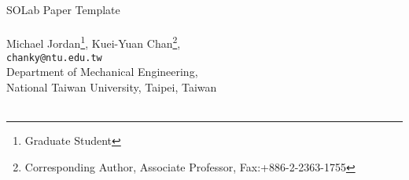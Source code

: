 \documentclass[a4paper,10pt]{article}
\newlength{\defbaselineskip}
\newcommand{\singlespacing}{\setlength{\baselineskip}{1.20 \defbaselineskip}}
\newcommand{\doublespacing}{\setlength{\baselineskip}{1.67 \defbaselineskip}}
\begin{document}
\begin{center}~\\~\\

{\Large {\sc SOLab Paper Template}}\\~\\

\singlespacing
Michael Jordan\footnote[1]{Graduate Student}, Kuei-Yuan Chan\footnote[2]{Corresponding Author, Associate Professor, Fax:+886-2-2363-1755}, \\
 {\tt chanky@ntu.edu.tw}\\
Department of Mechanical Engineering, \\
National Taiwan University, Taipei, Taiwan\\~\\


\doublespacing
\end{center}
\end{document}
